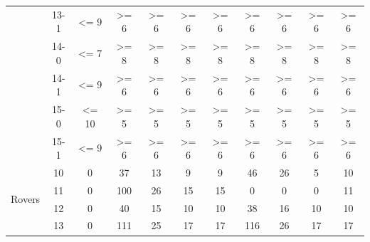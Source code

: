 \documentclass{article}
\theoremstyle{remark}
\begin{document}
{\begin{table}[ht]
\begin{tabular}{|cc||c||c|c|c|c||c|c|c|c|}
                                              & 13-1                     & \textless{}= 9           & \textgreater{}= 6  & \textgreater{}= 6  & \textgreater{}= 6 & \textgreater{}= 6 & \textgreater{}= 6  & \textgreater{}= 6  & \textgreater{}= 6 & \textgreater{}= 6  \\ \cline{2-11} 
                                              & 14-0                     & \textless{}= 7           & \textgreater{}= 8  & \textgreater{}= 8  & \textgreater{}= 8 & \textgreater{}= 8 & \textgreater{}= 8  & \textgreater{}= 8  & \textgreater{}= 8 & \textgreater{}= 8  \\ \cline{2-11} 
                                              & 14-1                     & \textless{}= 9           & \textgreater{}= 6  & \textgreater{}= 6  & \textgreater{}= 6 & \textgreater{}= 6 & \textgreater{}= 6  & \textgreater{}= 6  & \textgreater{}= 6 & \textgreater{}= 6  \\ \cline{2-11} 
                                              & 15-0                     & \textless{}= 10          & \textgreater{}= 5  & \textgreater{}= 5  & \textgreater{}= 5 & \textgreater{}= 5 & \textgreater{}= 5  & \textgreater{}= 5  & \textgreater{}= 5 & \textgreater{}= 5  \\ \cline{2-11} 
                                              & 15-1                     & \textless{}= 9           & \textgreater{}= 6  & \textgreater{}= 6  & \textgreater{}= 6 & \textgreater{}= 6 & \textgreater{}= 6  & \textgreater{}= 6  & \textgreater{}= 6 & \textgreater{}= 6  \\ \hline \hline
\multirow{7}{*}{Rovers}                       & 10                       & 0                        & 37                 & 13                 & 9                 & 9                 & 46                 & 26                 & 5                 & 10                 \\ \cline{2-11} 
                                              & 11                       & 0                        & 100                & 26                 & 15                & 15                & 0                  & 0                  & 0                 & 11                 \\ \cline{2-11} 
                                              & 12                       & 0                        & 40                 & 15                 & 10                & 10                & 38                 & 16                 & 10                & 10                 \\ \cline{2-11} 
                                              & 13                       & 0                        & 111                & 25                 & 17                & 17                & 116                & 26                 & 17                & 17                 \\ \cline{2-11} 

\end{tabular}
\end{table}}
\end{document}
